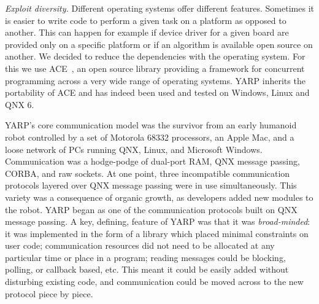 \noindent
%
%
\emph{Exploit diversity.} Different operating systems offer different
features. Sometimes it is easier to write code to perform a given task
on a platform as opposed to another. This can happen for example if 
device driver for a given board are provided only on a specific platform or
if an algorithm is available open source on another. We decided to reduce the
dependencies with the operating system. For this we
use ACE~\cite{ACEBook}, an open source library providing a framework for
concurrent programming across a very wide range of operating
systems. YARP inherits the portability of ACE and has indeed been used and
tested on Windows, Linux and QNX 6.


YARP's core communication model was the survivor from an early humanoid robot
controlled by a set of Motorola 68332 processors, an Apple Mac, and a loose network
of PCs running QNX, Linux, and Microsoft Windows.  Communication was a
hodge-podge of dual-port RAM, QNX message passing, CORBA, and raw
sockets.  At one point, three incompatible communication protocols
layered over QNX message passing were in use simultaneously.  This
variety was a consequence of organic growth, as developers added new
modules to the robot.  YARP began as one of the communication
protocols built on QNX message passing.  A key, defining, feature of
YARP was that it was {\em broad-minded}: it was
implemented in the form of a library which placed minimal constraints
on user code; communication resources did not need to be allocated at
any particular time or place in a program; reading messages could be
blocking, polling, or callback based, etc. This meant it could be
easily added without disturbing existing code, and communication could
be moved across to the new protocol piece by piece.

%


